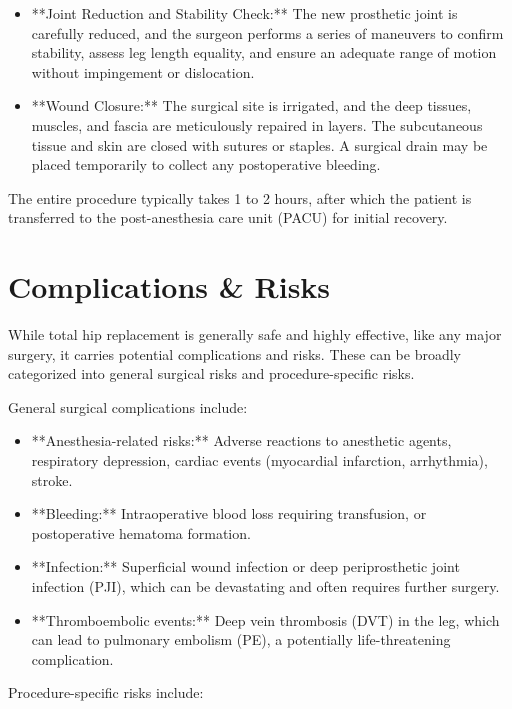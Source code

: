 \begin{itemize}
  \item **Joint Reduction and Stability Check:** The new prosthetic joint is carefully reduced, and the surgeon performs a series of maneuvers to confirm stability, assess leg length equality, and ensure an adequate range of motion without impingement or dislocation.
  
  \item **Wound Closure:** The surgical site is irrigated, and the deep tissues, muscles, and fascia are meticulously repaired in layers. The subcutaneous tissue and skin are closed with sutures or staples. A surgical drain may be placed temporarily to collect any postoperative bleeding.
\end{itemize}

The entire procedure typically takes 1 to 2 hours, after which the patient is transferred to the post-anesthesia care unit (PACU) for initial recovery.

\section*{Complications \& Risks}
While total hip replacement is generally safe and highly effective, like any major surgery, it carries potential complications and risks. These can be broadly categorized into general surgical risks and procedure-specific risks.

General surgical complications include:

\begin{itemize}
  \item **Anesthesia-related risks:** Adverse reactions to anesthetic agents, respiratory depression, cardiac events (myocardial infarction, arrhythmia), stroke.
  \item **Bleeding:** Intraoperative blood loss requiring transfusion, or postoperative hematoma formation.
  \item **Infection:** Superficial wound infection or deep periprosthetic joint infection (PJI), which can be devastating and often requires further surgery.
  \item **Thromboembolic events:** Deep vein thrombosis (DVT) in the leg, which can lead to pulmonary embolism (PE), a potentially life-threatening complication.
\end{itemize}

Procedure-specific risks include:

